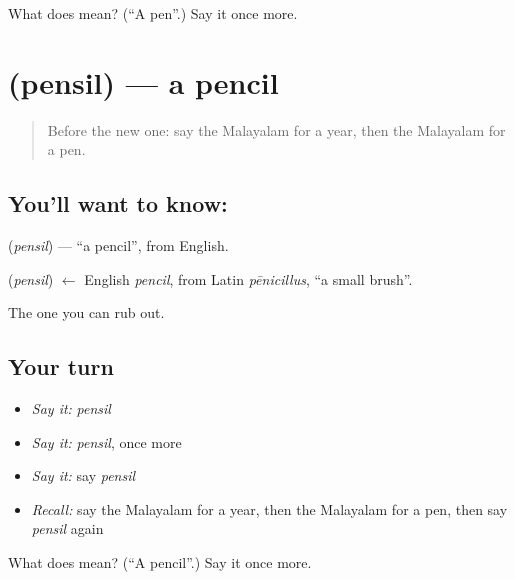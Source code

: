 \begin{tcolorbox}[breakable,colback=teal!4,colframe=teal!35!black,title={Before you move on}]
What does  mean? (\textquotedblleft{}A pen\textquotedblright{}.) Say it once more.
\end{tcolorbox}
\section[\texorpdfstring{\ml{പെൻസിൽ} (pensil)}{പെൻസിൽ (pensil)}]{ (pensil) — a pencil}

\label{lesson:ML-C140-pencil}



\begin{quote}
Before the new one: say the Malayalam for a year, then the Malayalam for a pen.
\end{quote}

\subsection*{You'll want to know: }
\textbf{} (\emph{pensil}) — \textquotedblleft{}a pencil\textquotedblright{}, from English.

\begin{cousinweb}
\textbf{} (\emph{pensil}) $\leftarrow$ English \emph{pencil}, from Latin \emph{pēnicillus}, \textquotedblleft{}a small brush\textquotedblright{}.
\end{cousinweb}

\begin{grammarlens}[title={What you've built}]
The one you can rub out.
\end{grammarlens}

\subsection*{Your turn}
\begin{itemize}
\raggedright
  \item \emph{Say it:} \emph{pensil}
  \item \emph{Say it:} \emph{pensil}, once more
  \item \emph{Say it:} say \emph{pensil}
  \item \emph{Recall:} say the Malayalam for a year, then the Malayalam for a pen, then say \emph{pensil} again
\end{itemize}

\begin{tcolorbox}[breakable,colback=teal!4,colframe=teal!35!black,title={Before you move on}]
What does  mean? (\textquotedblleft{}A pencil\textquotedblright{}.) Say it once more.
\end{tcolorbox}
